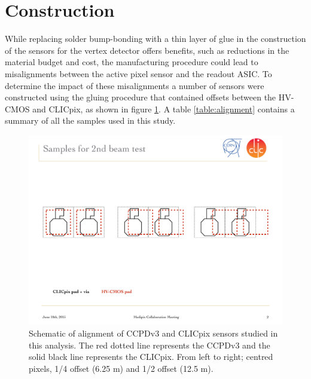
\section{Construction}
While replacing solder bump-bonding with a thin layer of glue in the construction of the sensors for the vertex detector offers benefits, such as reductions in the material budget and cost, the manufacturing procedure could lead to misalignments between the active pixel sensor and the readout ASIC.  To determine the impact of these misalignments a number of sensors were constructed using the gluing procedure that contained offsets between the HV-CMOS and CLICpix, as shown in figure \ref{fig:alignment}.  A table \ref{table:alignment} contains a summary of all the samples used in this study.

\begin{figure}
\centering
\includegraphics[width=1.0\textwidth]{CLICdpVertex/Plots/misalignedPads.pdf}
\caption[Schematic of alignment of CCPDv3 and CLICpix sensors studied in this analysis.]{Schematic of alignment of CCPDv3 and CLICpix sensors studied in this analysis.  The red dotted line represents the CCPDv3 and the solid black line represents the CLICpix.  From left to right; centred pixels, 1/4 offset (6.25 {\mu}m) and 1/2 offset (12.5 {\mu}m).}
\label{fig:alignment}
\end{figure}

